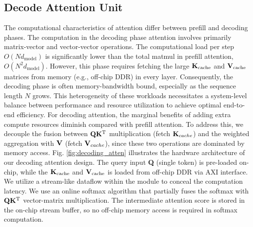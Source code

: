 \documentclass[sigconf]{acmart}
\begin{document}




\subsection{Decode Attention Unit}
The computational characteristics of attention differ between prefill and decoding phases. The computation in the decoding phase attention involves primarily matrix-vector and vector-vector operations. The computational load per step $O(Nd_{\text{model}})$ is significantly lower than the total matmul in prefill attention, $O(N^2d_{\text{model}})$. However, this phase requires fetching the large ${\bf K}_{\text{cache}}$ and ${\bf V}_{\text{cache}}$ matrices from memory (e.g., off-chip DDR) in every layer. Consequently, the decoding phase is often memory-bandwidth bound, especially as the sequence length $N$ grows. 
This heterogeneity of these workloads necessitates a system-level balance between performance and resource utilization to achieve optimal end-to-end efficiency.
For decoding attention, the marginal benefits of adding extra compute resources diminish compared with prefill attention. To address this, we decouple the fusion between $\bf{QK^{\text T}}$ multiplication (fetch ${\bf K}_{cache}$) and the weighted aggregation with ${\bf V}$ (fetch ${\bf V}_{cache}$), since these two operations are dominated by memory access. 
 Fig. \ref{fig:decoding_atten} illustrates the hardware architecture of our decoding attention design. The query input \textbf{Q} (single token) is pre-loaded on-chip, while the 
${\bf K}_{\text{cache}}$ and ${\bf V}_{\text{cache}}$ is loaded from off-chip DDR via AXI interface. We utilize a stream-like dataflow within the module to conceal the computation latency. We use an online softmax algorithm that partially fuses the softmax with $\bf{QK^{\text T}}$ vector-matrix multiplication. The intermediate attention score is stored in the on-chip stream buffer, so no off-chip memory access is required in softmax computation.
\end{document}
